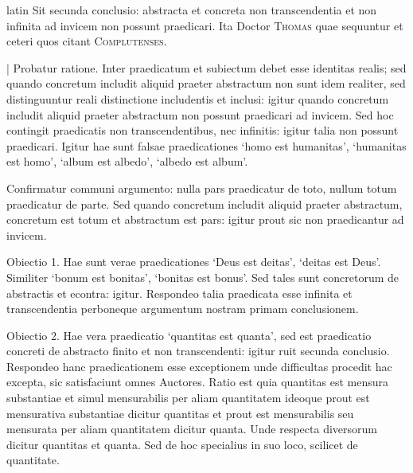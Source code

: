 \begin{otherlanguage*}{latin}
\pstart
  Sit secunda conclusio: abstracta et concreta non transcendentia et non infinita ad invicem non possunt praedicari. Ita Doctor \textsc{Thomas} quae sequuntur    et ceteri quos citant \textsc{Complutenses}\index[persons]{}. 
\pend

\pstart
  \textnormal{|} Probatur ratione. Inter praedicatum et subiectum debet esse identitas realis; sed quando concretum includit aliquid praeter abstractum non sunt idem realiter, sed distinguuntur reali distinctione includentis et inclusi: igitur quando concretum includit aliquid praeter abstractum non possunt praedicari ad invicem. Sed hoc contingit praedicatis non transcendentibus, nec infinitis: igitur talia non possunt praedicari. Igitur hae sunt falsae praedicationes `homo est humanitas', `humanitas est homo', `album est albedo', `albedo est album'. 
\pend

\pstart
  Confirmatur communi argumento: nulla pars praedicatur de toto, nullum totum praedicatur de parte. Sed quando concretum includit aliquid praeter abstractum, concretum est totum et abstractum est pars: igitur prout sic non praedicantur ad invicem. 
\pend

\pstart
  Obiectio 1. Hae sunt verae praedicationes `Deus est deitas', `deitas est Deus'. Similiter `bonum est bonitas', `bonitas est bonus'. Sed tales sunt concretorum de abstractis et econtra: igitur. Respondeo talia praedicata esse infinita et transcendentia perboneque argumentum nostram primam conclusionem. 
\pend

\pstart
  Obiectio 2. Hae vera praedicatio `quantitas est quanta', sed est praedicatio concreti de abstracto finito et non transcendenti: igitur ruit secunda conclusio. Respondeo hanc praedicationem esse exceptionem unde difficultas procedit hac excepta, sic satisfaciunt omnes Auctores. Ratio est quia quantitas est mensura substantiae et simul mensurabilis per aliam quantitatem ideoque prout est mensurativa substantiae dicitur quantitas et prout est mensurabilis seu mensurata per aliam quantitatem dicitur quanta. Unde respecta diversorum dicitur quantitas et quanta. Sed de hoc specialius in suo loco, scilicet de quantitate. 
\pend

        \pstart
        \pend
      

\end{otherlanguage*}
